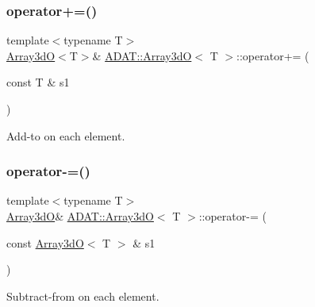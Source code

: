 \subsubsection{\texorpdfstring{operator+=()}{operator+=()}\hspace{0.1cm}{\footnotesize\ttfamily [6/6]}}
{\footnotesize\ttfamily template$<$typename T$>$ \\
\mbox{\hyperlink{classADAT_1_1Array3dO}{Array3dO}}$<$T$>$\& \mbox{\hyperlink{classADAT_1_1Array3dO}{A\+D\+A\+T\+::\+Array3dO}}$<$ T $>$\+::operator+= (\begin{DoxyParamCaption}\item[{const T \&}]{s1 }\end{DoxyParamCaption})\hspace{0.3cm}{\ttfamily [inline]}}



Add-\/to on each element. 

\mbox{\label{classADAT_1_1Array3dO_a5c840f5014264fdee101194d22f237e0}} 
\subsubsection{\texorpdfstring{operator-\/=()}{operator-=()}\hspace{0.1cm}{\footnotesize\ttfamily [1/6]}}
{\footnotesize\ttfamily template$<$typename T$>$ \\
\mbox{\hyperlink{classADAT_1_1Array3dO}{Array3dO}}\& \mbox{\hyperlink{classADAT_1_1Array3dO}{A\+D\+A\+T\+::\+Array3dO}}$<$ T $>$\+::operator-\/= (\begin{DoxyParamCaption}\item[{const \mbox{\hyperlink{classADAT_1_1Array3dO}{Array3dO}}$<$ T $>$ \&}]{s1 }\end{DoxyParamCaption})\hspace{0.3cm}{\ttfamily [inline]}}



Subtract-\/from on each element. 

\mbox{\label{classADAT_1_1Array3dO_a5c840f5014264fdee101194d22f237e0}} 
